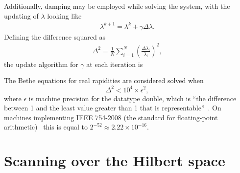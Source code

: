 \documentclass[11pt, a4paper]{report} %
\begin{document}
Additionally, damping may be employed while solving the system, with the updating of \(\lambda\) looking like
\begin{align}
  \label{eq:dampednewton}
  \lambda^{k+1} = \lambda^k + \gamma \Delta \lambda.
\end{align}
Defining the difference squared as
\begin{align}
  \label{eq:51}
  \Delta^2 = \frac{1}{N}\sum_{i=1}^{N} \left(\frac{\Delta \lambda_i}{\lambda_i}\right)^2,
\end{align}
the update algorithm for \(\gamma\) at each iteration is
\begin{algorithm}
  \begin{algorithmic}[0]
    \Else{}
    \EndIf{}
  \end{algorithmic}
\end{algorithm}

The Bethe equations for real rapidities are considered solved when~\cite{Caux2009}
\begin{equation}
	\Delta^2 < 10^4 \times \epsilon^2,
\end{equation}
where \(\epsilon\) is machine precision for the datatype double, which is ``the difference between 1 and the least value greater than 1 that is representable''~\cite{cppstandard2016}.
On machines implementing IEEE 754-2008 (the standard for floating-point arithmetic)~\cite{ieeefp2008} this is equal to \({2^{-52} \approx 2.22 \times 10^{-16}}\).


\section{Scanning over the Hilbert space}
\end{document}
